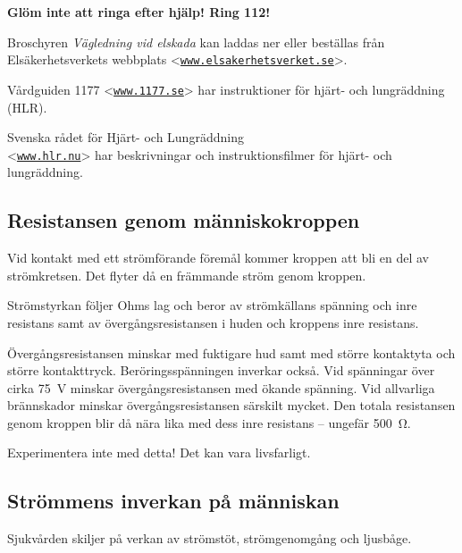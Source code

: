 \textbf{Glöm inte att ringa efter hjälp! Ring 112!}

Broschyren \emph{Vägledning vid elskada} kan laddas ner eller beställas från
Elsäkerhetsverkets webbplats
<\href{https://www.elsakerhetsverket.se}{\texttt{www.elsakerhetsverket.se}}>.

Vårdguiden 1177 <\href{https://www.1177.se}{\texttt{www.1177.se}}> har
instruktioner för hjärt- och lungräddning (HLR).

Svenska rådet för Hjärt- och Lungräddning \\
<\href{https://www.hlr.nu}{\texttt{www.hlr.nu}}> har beskrivningar och
instruktionsfilmer för hjärt- och lungräddning.

\subsection{Resistansen genom människo\-kroppen}

Vid kontakt med ett strömförande föremål kommer kroppen att bli en del av
strömkretsen.
Det flyter då en främmande ström genom kroppen.

Strömstyrkan följer Ohms lag och beror av strömkällans spänning och inre
resistans samt av övergångsresistansen i huden och kroppens inre resistans.

Övergångsresistansen minskar med fuktigare hud samt med större kontaktyta och
större kontakttryck.
Beröringsspänningen inverkar också.
Vid spänningar över cirka \qty{75}{\volt} minskar övergångsresistansen med
ökande spänning.
Vid allvarliga brännskador minskar övergångsresistansen särskilt mycket.
Den totala resistansen genom kroppen blir då nära lika med dess inre resistans
-- ungefär \qty{500}{\ohm}.

\begin{center}
\begin{minipage}{0.19\columnwidth}
\Huge{\selectfont{}\relax}
\end{minipage}
\begin{minipage}{0.7\columnwidth}
  Experimentera inte med detta! Det kan vara livsfarligt.
\end{minipage}
\end{center}


\subsection{Strömmens inverkan på människan}

Sjukvården skiljer på verkan av strömstöt, strömgenomgång och ljusbåge.

